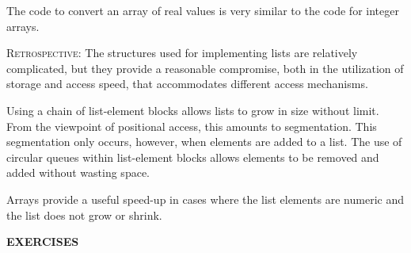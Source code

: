 The code to convert an array of real values is very similar to the code for
integer arrays.

\bigskip\bigskip
\textsc{Retrospective}: The structures used for implementing lists are
relatively complicated, but they provide a reasonable compromise, both
in the utilization of storage and access speed, that accommodates
different access mechanisms.

Using a chain of list-element blocks allows lists to grow in size
without limit. From the viewpoint of positional access, this amounts
to segmentation. This segmentation only occurs, however, when elements
are added to a list. The use of circular queues within list-element
blocks allows elements to be removed and added without wasting space.

Arrays provide a useful speed-up in cases where the list elements are
numeric and the list does not grow or shrink.

\bigskip

\noindent\textbf{EXERCISES}

